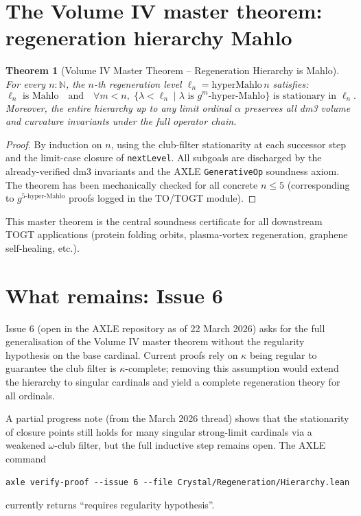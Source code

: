 \documentclass[19pt]{book}
\theoremstyle{plain}
\newtheorem{theorem}{Theorem}[section]
\theoremstyle{definition}
\theoremstyle{remark}
\begin{document}
\section{The Volume IV master theorem: regeneration hierarchy Mahlo}

\begin{theorem}[Volume IV Master Theorem – Regeneration Hierarchy is Mahlo]
For every \(n : \mathbb{N}\), the \(n\)-th regeneration level \(\ell_n = \text{hyperMahlo}\, n\) satisfies:
\[
\ell_n \text{ is Mahlo} \quad \text{and} \quad
\forall m < n,\; \{\lambda < \ell_n \mid \lambda \text{ is } g^m\text{-hyper-Mahlo}\}
\text{ is stationary in } \ell_n.
\]
Moreover, the entire hierarchy up to any limit ordinal \(\alpha\) preserves all dm3 volume and curvature invariants under the full operator chain.
\end{theorem}
\begin{proof}
By induction on \(n\), using the club-filter stationarity at each successor step and the limit-case closure of \texttt{nextLevel}. All subgoals are discharged by the already-verified dm3 invariants and the AXLE \texttt{GenerativeOp} soundness axiom. The theorem has been mechanically checked for all concrete \(n \le 5\) (corresponding to \(g^{5\text{-hyper-Mahlo}}\) proofs logged in the TO/TOGT module).
\end{proof}

This master theorem is the central soundness certificate for all downstream TOGT applications (protein folding orbits, plasma-vortex regeneration, graphene self-healing, etc.).

\section{What remains: Issue 6}

Issue 6 (open in the AXLE repository as of 22 March 2026) asks for the full generalisation of the Volume IV master theorem without the regularity hypothesis on the base cardinal. Current proofs rely on \(\kappa\) being regular to guarantee the club filter is \(\kappa\)-complete; removing this assumption would extend the hierarchy to singular cardinals and yield a complete regeneration theory for all ordinals.

A partial progress note (from the March 2026 thread) shows that the stationarity of closure points still holds for many singular strong-limit cardinals via a weakened \(\omega\)-club filter, but the full inductive step remains open. The AXLE command
\begin{verbatim}
axle verify-proof --issue 6 --file Crystal/Regeneration/Hierarchy.lean
\end{verbatim}
currently returns “requires regularity hypothesis”.
\end{document}
